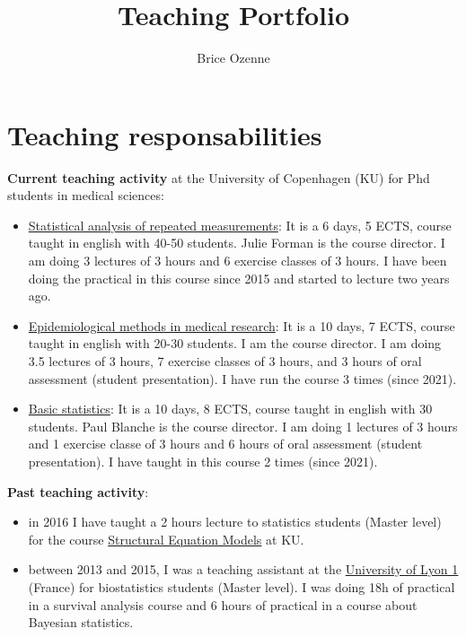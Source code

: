 \documentclass[12pt]{article}
\author{Brice Ozenne}
\date{}
\title{Teaching Portfolio}
\begin{document}
\maketitle

\section{Teaching responsabilities}
\label{sec:orge651b25}

\textbf{Current teaching activity} at the University of Copenhagen (KU) for
Phd students in medical sciences:
\begin{itemize}
\item \href{https://absalon.ku.dk/courses/47665}{Statistical analysis of repeated measurements}: \newline It is a 6
days, 5 ECTS, course taught in english with 40-50 students. Julie
Forman is the course director. \newline I am doing 3 lectures of 3
hours and 6 exercise classes of 3 hours. I have been doing the
practical in this course since 2015 and started to lecture two years
ago.
\item \href{https://absalon.ku.dk/courses/58764}{Epidemiological methods in medical research}: \newline It is a 10
days, 7 ECTS, course taught in english with 20-30 students. I am the
course director. \newline I am doing 3.5 lectures of 3 hours, 7
exercise classes of 3 hours, and 3 hours of oral assessment (student
presentation). I have run the course 3 times (since 2021).
\item \href{http://paulblanche.com/files/BasicStat2023.html}{Basic statistics}: \newline It is a 10 days, 8 ECTS, course taught in
english with 30 students. Paul Blanche is the course
director. \newline I am doing 1 lectures of 3 hours and 1 exercise
classe of 3 hours and 6 hours of oral assessment (student
presentation). I have taught in this course 2 times (since 2021).
\end{itemize}

\textbf{Past teaching activity}:
\begin{itemize}
\item in 2016 I have taught a 2 hours lecture to statistics students
(Master level) for the course \href{https://absalon.instructure.com/courses/2385}{Structural Equation Models} at KU.
\item between 2013 and 2015, I was a teaching assistant at the \href{https://mastersantepublique.univ-lyon1.fr/icap\_website/299/5382}{University
of Lyon 1} (France) for biostatistics students (Master level). I was
doing 18h of practical in a survival analysis course and 6 hours of
practical in a course about Bayesian statistics.
\end{itemize}
\end{document}
